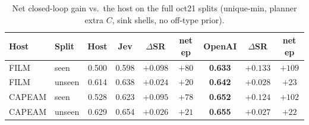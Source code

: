 \begin{table}[t]
\centering
\caption{Net closed-loop gain vs.\ the host on the full oct21 splits (unique-min, planner extra $C$, sink shells, no off-type prior).}
\label{tab:v1v2}
\scriptsize
\setlength{\tabcolsep}{3pt}
\begin{tabular}{llccccccc}
\toprule
Host & Split & Host & Jev & $\Delta$SR & net ep & OpenAI & $\Delta$SR & net ep \\
\midrule
FILM & seen & 0.500 & 0.598 & $+0.098$ & $+80$ & \textbf{0.633} & $+0.133$ & $+109$ \\
FILM & unseen & 0.614 & 0.638 & $+0.024$ & $+20$ & \textbf{0.642} & $+0.028$ & $+23$ \\
CAPEAM & seen & 0.528 & 0.623 & $+0.095$ & $+78$ & \textbf{0.652} & $+0.124$ & $+102$ \\
CAPEAM & unseen & 0.629 & 0.654 & $+0.026$ & $+21$ & \textbf{0.655} & $+0.027$ & $+22$ \\
\bottomrule
\end{tabular}
\end{table}
